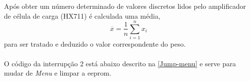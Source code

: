 {
	
}
Após obter um número determinado de valores discretos lidos pelo amplificador de célula de carga (HX711) é calculada uma média,
\begin{equation}
	\label{eq:Mean}
	\overline{x}  =  \frac{1}{n}\sum_{i=1}^n x_i
\end{equation}
para ser tratado e deduzido o valor correspondente do peso.
\\
\\
O código da interrupção 2 está abaixo descrito na \autoref{Jump-menu} e serve para mudar de \textit{Menu} e limpar a \acs{eeprom}.
{
	
}

